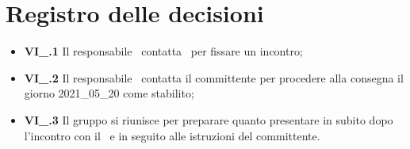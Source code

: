 \section{Registro delle decisioni}
\begin{itemize}
	\item \textbf{VI\_\Data.1} 
	Il responsabile \PC\ contatta \Proponente\ per fissare un incontro;
	\item \textbf{VI\_\Data.2} 
	Il responsabile \PC\ contatta il committente per procedere alla consegna il giorno 2021\_05\_20 come stabilito;
	\item \textbf{VI\_\Data.3} 
	Il gruppo si riunisce per preparare quanto presentare in  subito dopo l'incontro con il \Proponente\ e in seguito alle istruzioni del committente.
\end{itemize}